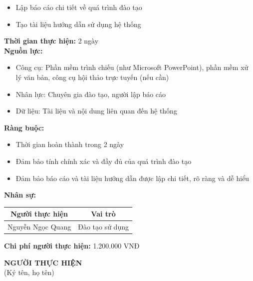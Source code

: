 {\begin{minipage}{\textwidth}
\begin{itemize}
        \item Lập báo cáo chi tiết về quá trình đào tạo
        \item Tạo tài liệu hướng dẫn sử dụng hệ thống
    \end{itemize}
    \vspace{0.5cm}
    \noindent \textbf{Thời gian thực hiện:} 2 ngày \\
    \noindent \textbf{Nguồn lực:}
    \begin{itemize}
        \item Công cụ: Phần mềm trình chiếu (như Microsoft PowerPoint), phần mềm xử lý văn bản, công cụ hội thảo trực tuyến (nếu cần)
        \item Nhân lực: Chuyên gia đào tạo, người lập báo cáo
        \item Dữ liệu: Tài liệu và nội dung liên quan đến hệ thống
    \end{itemize}
    \vspace{0.5cm}
    \noindent \textbf{Ràng buộc:}
    \begin{itemize}
        \item Thời gian hoàn thành trong 2 ngày
        \item Đảm bảo tính chính xác và đầy đủ của quá trình đào tạo
        \item Đảm bảo báo cáo và tài liệu hướng dẫn được lập chi tiết, rõ ràng và dễ hiểu
    \end{itemize}
    \vspace{0.5cm}
    \noindent \textbf{Nhân sự:}
    \begin{longtable}{|c|c|}
    \hline
    \textbf{Người thực hiện} & \textbf{Vai trò} \\
    \hline
    Nguyễn Ngọc Quang & Đào tạo sử dụng \\
    \hline
    \end{longtable}
    \vspace{0.5cm}
    \noindent \textbf{Chi phí người thực hiện:} 1.200.000 VNĐ \\
    \vspace{1cm}
    \begin{flushleft}
        \hspace{8cm} \textbf{NGƯỜI THỰC HIỆN} \\
        \hspace{8.8cm} (Ký tên, họ tên) \\
        \vspace{1cm}
    \end{flushleft}
    \end{minipage}
}
% 

